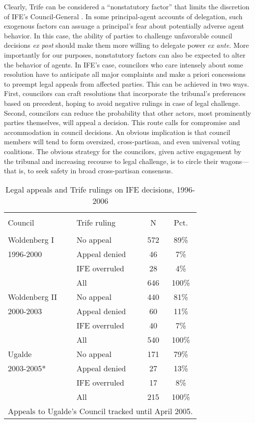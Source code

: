 \documentclass[12 pt, letter]{article}
\begin{document}
Clearly, {\sc Trife} can be considered a ``nonstatutory factor''
that limits the discretion of IFE's Council-General
\citep{Huber2002}.  In some principal-agent accounts of delegation,
such exogenous factors can assuage a principal's fear about
potentially adverse agent behavior.  In this case, the ability of
parties to challenge unfavorable council decisions \emph{ex post}
should make them more willing to delegate power \emph{ex ante}.
More importantly for our purposes, nonstatutory factors can also be
expected to alter the behavior of agents.  In IFE's case, councilors
who care intensely about some resolution have to anticipate all
major complaints and make a priori concessions to preempt legal
appeals from affected parties.  This can be achieved in two ways.
First, councilors can craft resolutions that incorporate the
tribunal's preferences based on precedent, hoping to avoid negative
rulings in case of legal challenge.  Second, councilors can reduce
the probability that other actors, most prominently parties
themselves, will appeal a decision.  This route calls for compromise
and accommodation in council decisions.  An obvious implication is
that council members will tend to form oversized, cross-partisan,
and even universal voting coalitions.  The obvious strategy for the
councilors, given active engagement by the tribunal and increasing
recourse to legal challenge, is to circle their wagons---that is, to
seek safety in broad cross-partisan consensus.

\begin{table}
\caption{Legal appeals and {\sc Trife} rulings on IFE decisions, 1996-2006}\label{T:rulings}
\begin{center}
\begin{tabular}{llcc}
\hline\\ [-1.5ex]
Council & {\sc Trife} ruling &  N  & Pct. \\
\hline \\ [-1ex]
Woldenberg I & No appeal  & 572 &  89\% \\
1996-2000 & Appeal denied &  46 &   7\% \\
          & IFE overruled &  28 &   4\% \\
          & All           & 646 & 100\% \\ [1.2ex]
Woldenberg II & No appeal & 440 &  81\% \\
2000-2003 & Appeal denied &  60 &  11\% \\
          & IFE overruled &  40 &   7\% \\
          & All           & 540 & 100\% \\ [1.2ex]
Ugalde    & No appeal     & 171 &  79\% \\
2003-2005* & Appeal denied &  27 &  13\% \\
          & IFE overruled &  17 &   8\% \\
          & All           & 215 & 100\% \\
\hline \multicolumn{4}{l}{\small * Appeals to Ugalde's Council
tracked until April 2005.}
\end{tabular}
\end{center}
\end{table}
\end{document}
